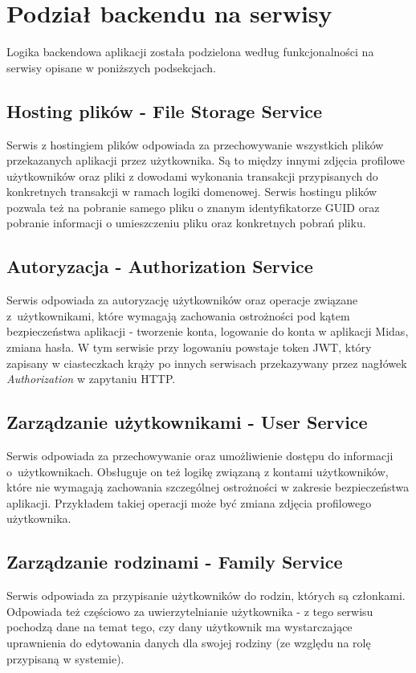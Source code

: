 \documentclass{SGGW-thesis}
\begin{document}
\section{Podział backendu na serwisy}
Logika backendowa aplikacji została podzielona według funkcjonalności na serwisy opisane w poniższych podsekcjach.

\subsection{Hosting plików - File Storage Service}
Serwis z hostingiem plików odpowiada za przechowywanie wszystkich plików przekazanych aplikacji przez użytkownika. Są to między innymi zdjęcia profilowe użytkowników oraz pliki z dowodami wykonania transakcji przypisanych do konkretnych transakcji w ramach logiki domenowej. Serwis hostingu plików pozwala też na pobranie samego pliku o znanym identyfikatorze GUID oraz pobranie informacji o umieszczeniu pliku oraz konkretnych pobrań pliku.

\subsection{Autoryzacja - Authorization Service}
Serwis odpowiada za autoryzację użytkowników oraz operacje związane z~użytkownikami, które wymagają zachowania ostrożności pod kątem bezpieczeństwa aplikacji - tworzenie konta, logowanie do konta w aplikacji Midas, zmiana hasła. W tym serwisie przy logowaniu powstaje token JWT, który zapisany w ciasteczkach krąży po innych serwisach przekazywany przez nagłówek \textit{Authorization} w zapytaniu HTTP.

\subsection{Zarządzanie użytkownikami - User Service}
Serwis odpowiada za przechowywanie oraz umożliwienie dostępu do informacji o~użytkownikach. Obsługuje on też logikę związaną z kontami użytkowników, które nie wymagają zachowania szczególnej ostrożności w zakresie bezpieczeństwa aplikacji. Przykładem takiej operacji może być zmiana zdjęcia profilowego użytkownika.

\subsection{Zarządzanie rodzinami - Family Service}
Serwis odpowiada za przypisanie użytkowników do rodzin, których są członkami. Odpowiada też częściowo za uwierzytelnianie użytkownika - z tego serwisu pochodzą dane na temat tego, czy dany użytkownik ma wystarczające uprawnienia do edytowania danych dla swojej rodziny (ze względu na rolę przypisaną w systemie).
\end{document}
